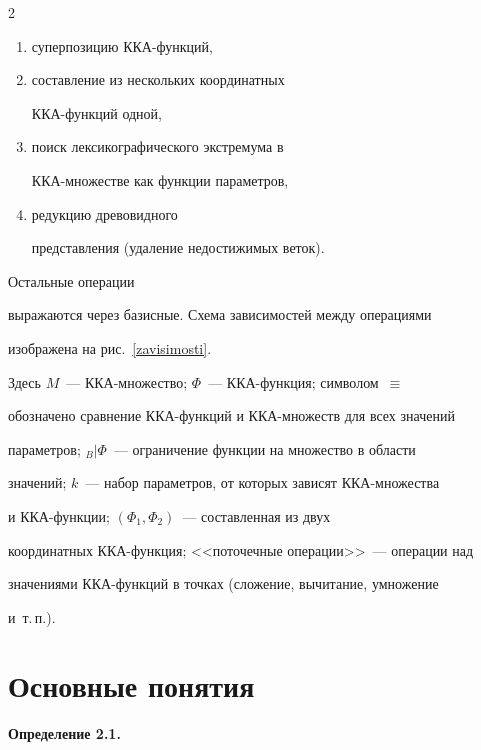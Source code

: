 \begin{multicols}{2}
\begin{enumerate}[(1)]

\item суперпозицию ККА-функ\-ций, \\[-15pt]

\item составление из нескольких координатных

ККА-функ\-ций одной, 

\item поиск лексикографического экстремума в

ККА-мно\-жест\-ве как функции па\-ра\-мет\-ров, 

\item редукцию древовидного

пред\-став\-ле\-ния (удаление недостижимых веток).

\end{enumerate}

 Остальные операции

выражаются через базисные. Схема зависимостей между операциями

изображена на рис.~\ref{zavisimosti}.

Здесь $M$~--- ККА-множество; $\Phi$~--- ККА-функ\-ция; символом~$\equiv$

обозначено сравнение ККА-функ\-ций и ККА-мно\-жеств для всех значений

па\-ра\-мет\-ров; $_B|\Phi$~--- ограничение функции на множество в об\-ласти

значений; $k$~--- набор па\-ра\-мет\-ров, от которых зависят ККА-мно\-жест\-ва

и ККА-функ\-ции; $(\Phi_1,\Phi_2)$~--- составленная из двух

координатных ККА-функ\-ция; <<поточечные операции>>~--- операции над

значениями ККА-функ\-ций в точках (сложение, вычитание, умно\-же\-ние 

и~т.\,п.).





\section{Основные понятия}





\smallskip



\noindent

\textbf{Определение 2.1.}


\end{multicols}
